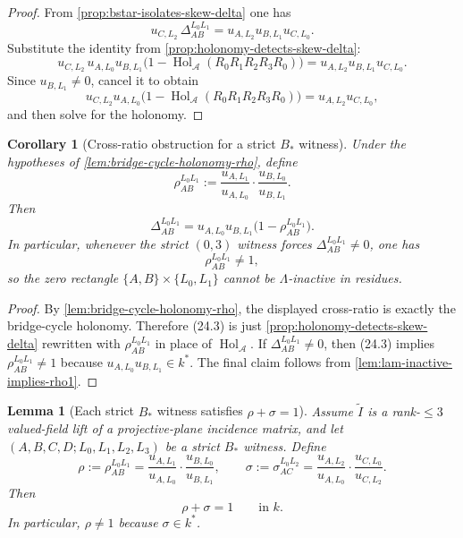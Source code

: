\documentclass[11pt]{amsart}
\numberwithin{equation}{section}
\theoremstyle{plain}
\newtheorem{lemma}[theorem]{Lemma}
\newtheorem{corollary}[theorem]{Corollary}
\theoremstyle{definition}
\theoremstyle{remark}
\newcommand{\Lam}{\Lambda}
\begin{document}
\begin{proof}
From \cref{prop:bstar-isolates-skew-delta} one has
\[
u_{C,L_2}\,\Delta_{AB}^{L_0L_1}=u_{A,L_2}u_{B,L_1}u_{C,L_0}.
\]
Substitute the identity from \cref{prop:holonomy-detects-skew-delta}:
\[
u_{C,L_2}\,u_{A,L_0}u_{B,L_1}\bigl(1-\operatorname{Hol}_{\mathcal A}(R_0R_1R_2R_3R_0)\bigr)
=u_{A,L_2}u_{B,L_1}u_{C,L_0}.
\]
Since $u_{B,L_1}\neq 0$, cancel it to obtain
\[
u_{C,L_2}u_{A,L_0}\bigl(1-\operatorname{Hol}_{\mathcal A}(R_0R_1R_2R_3R_0)\bigr)=u_{A,L_2}u_{C,L_0},
\]
and then solve for the holonomy.
\end{proof}

\begin{corollary}[Cross-ratio obstruction for a strict $B_*$ witness]
\label{cor:bstar-cross-ratio-obstruction}
Under the hypotheses of \cref{lem:bridge-cycle-holonomy-rho}, define
\[
\rho_{AB}^{L_0L_1}:=\frac{u_{A,L_1}}{u_{A,L_0}}\cdot\frac{u_{B,L_0}}{u_{B,L_1}}.
\]
Then
\[
\Delta_{AB}^{L_0L_1}=u_{A,L_0}u_{B,L_1}\bigl(1-\rho_{AB}^{L_0L_1}\bigr).
\tag{24.3}
\]
In particular, whenever the strict $(0,3)$ witness forces $\Delta_{AB}^{L_0L_1}\neq0$, one has
\[
\rho_{AB}^{L_0L_1}\neq1,
\]
so the zero rectangle $\{A,B\}\times\{L_0,L_1\}$ cannot be $\Lam$-inactive in residues.
\end{corollary}

\begin{proof}
By \cref{lem:bridge-cycle-holonomy-rho}, the displayed cross-ratio is exactly the bridge-cycle holonomy. Therefore \textup{(24.3)} is just \cref{prop:holonomy-detects-skew-delta} rewritten with $\rho_{AB}^{L_0L_1}$ in place of $\operatorname{Hol}_{\mathcal A}$. If $\Delta_{AB}^{L_0L_1}\neq0$, then \textup{(24.3)} implies $\rho_{AB}^{L_0L_1}\neq1$ because $u_{A,L_0}u_{B,L_1}\in k^*$. The final claim follows from \cref{lem:lam-inactive-implies-rho1}.
\end{proof}

\begin{lemma}[Each strict $B_*$ witness satisfies $\rho+\sigma=1$]
\label{lem:bstar-rho-plus-sigma}
Assume $\widetilde I$ is a rank-$\le 3$ valued-field lift of a projective-plane incidence matrix, and let
$(A,B,C,D;L_0,L_1,L_2,L_3)$ be a strict $B_*$ witness. Define
\[
\rho:=\rho_{AB}^{L_0L_1}=\frac{u_{A,L_1}}{u_{A,L_0}}\cdot\frac{u_{B,L_0}}{u_{B,L_1}},
\qquad
\sigma:=\sigma_{AC}^{L_0L_2}=\frac{u_{A,L_2}}{u_{A,L_0}}\cdot\frac{u_{C,L_0}}{u_{C,L_2}}.
\]
Then
\[
\rho+\sigma=1
\qquad\text{in }k.
\tag{26.1}
\]
In particular, $\rho\neq 1$ because $\sigma\in k^*$.
\end{lemma}
\end{document}
